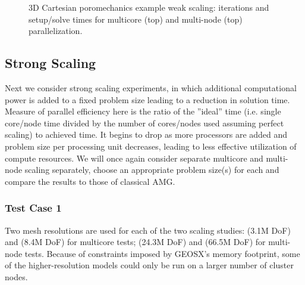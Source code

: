 \begin{figure} [htbp]
  \begin{subfigure}[t]{0.48\textwidth}
    \centering
    
  \end{subfigure}
  \hfill
  \begin{subfigure}[t]{0.48\textwidth}
    \centering
    
  \end{subfigure}
  \begin{subfigure}[t]{0.48\textwidth}
    \centering
    
  \end{subfigure}
  \hfill
  \begin{subfigure}[t]{0.48\textwidth}
    \centering
    
  \end{subfigure}
  \caption[3D Cartesian poromechanics example weak scaling]{3D Cartesian poromechanics example weak scaling: iterations and setup/solve times for multicore (top) and multi-node (top) parallelization.}
  \label{fig:cart_scaling_weak_poro}
\end{figure}

\subsection{Strong Scaling}
\label{subsec:par_scaling_strong}

Next we consider strong scaling experiments, in which additional computational power is added to a fixed problem size leading to a reduction in solution time.   Measure of parallel efficiency here is the ratio of the ''ideal'' time (i.e. single core/node time divided by the number of cores/nodes used assuming perfect scaling) to achieved time.   It begins to drop as more processors are added and problem size per processing unit decreases, leading to less effective utilization of compute resources.    We will once again consider separate multicore and multi-node scaling separately, choose an appropriate problem size(s) for each and compare the results to those of classical AMG.

\subsubsection{Test Case 1}
Two mesh resolutions are used for each of the two scaling studies:  (3.1M DoF) and  (8.4M DoF) for multicore tests;  (24.3M DoF) and  (66.5M DoF) for multi-node tests.   Because of constraints imposed by GEOSX's memory footprint, some of the higher-resolution models could only be run on a larger number of cluster nodes.

